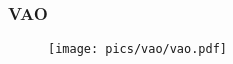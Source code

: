 \begin{frame}[fragile]
\frametitle{VAO}
  \begin{figure}[h]
  \texttt{[image: pics/vao/vao.pdf]}
  \end{figure}
\end{frame}

